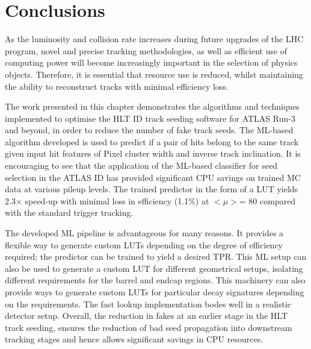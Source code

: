 

\section{Conclusions}

As the luminosity and collision rate increases during future upgrades of the LHC program, novel and precise tracking methodologies, as well as efficient use of computing power will become increasingly important in the selection of physics objects. Therefore, it is essential that resource use is reduced, whilst maintaining the ability to reconstruct tracks with minimal efficiency loss. 

The work presented in this chapter demonstrates the algorithms and techniques implemented to optimise the HLT ID track seeding software for ATLAS Run-3 and beyond, in order to reduce the number of fake track seeds. The ML-based algorithm developed is used to predict if a pair of hits belong to the same track given input hit features of Pixel cluster width and inverse track inclination. It is encouraging to see that the application of the ML-based classifier for seed selection in the ATLAS ID has provided significant CPU savings on trained MC data at various pileup levels. The trained predictor in the form of a LUT yields 2.3$\times$ speed-up with minimal loss in efficiency (1.1\%) at $< \mu >$= 80 compared with the standard trigger tracking. 

The developed ML pipeline is advantageous for many reasons. It provides a flexible way to generate custom LUTs depending on the degree of efficiency required; the predictor can be trained to yield a desired TPR. This ML setup can also be used to generate a custom LUT for different geometrical setups, isolating different requirements for the barrel and endcap regions. This machinery can also provide ways to generate custom LUTs for particular decay signatures depending on the requirements. The fast lookup implementation bodes well in a realistic detector setup. Overall, the reduction in fakes at an earlier stage in the HLT track seeding, ensures the reduction of bad seed propagation into downstream tracking stages and hence allows significant savings in CPU resources.

